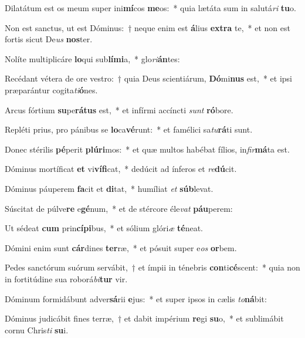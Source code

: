 \item Dilatátum est os meum super ini\textbf{mí}cos \textbf{me}os:~* quia lætáta sum in salutá\textit{ri} \textbf{tu}o.
\item Non est sanctus, ut est Dóminus:~† neque enim est \textbf{á}lius \textbf{ex}\textbf{tra} te,~* et non est fortis sicut De\textit{us} \textbf{nos}ter.
\item Nolíte multiplicáre \textbf{lo}qui sub\textbf{lí}\textbf{mi}a,~* glo\textit{ri}\textbf{án}tes:
\item Recédant vétera de ore vestro:~† quia Deus scientiárum, \textbf{Dó}mi\textbf{nus} est,~* et ipsi præparántur cogita\textit{ti}\textbf{ó}nes.
\item Arcus fórtium \textbf{su}pe\textbf{rá}\textbf{tus} est,~* et infírmi accíncti \textit{sunt} \textbf{ró}bore.
\item Repléti prius, pro pánibus se \textbf{lo}ca\textbf{vé}runt:~* et famélici sa\textit{tu}\textbf{rá}ti sunt.
\item Donec stérilis \textbf{pé}perit \textbf{plú}\textbf{ri}mos:~* et quæ multos habébat fílios, in\textit{fir}\textbf{má}ta est.
\item Dóminus mortíficat \textbf{et} vi\textbf{ví}\textbf{fi}cat,~* dedúcit ad ínferos et \textit{re}\textbf{dú}cit.
\item Dóminus páuperem \textbf{fa}cit et \textbf{di}tat,~* humíliat \textit{et} \textbf{súb}levat.
\item Súscitat de púlve\textbf{re} e\textbf{gé}num,~* et de stércore éle\textit{vat} \textbf{páu}perem:
\item Ut sédeat \textbf{cum} prin\textbf{cí}\textbf{pi}bus,~* et sólium glóri\textit{æ} \textbf{té}neat.
\item Dómini enim sunt \textbf{cár}dines \textbf{ter}ræ,~* et pósuit super e\textit{os} \textbf{or}bem.
\item Pedes sanctórum suórum servábit,~† et ímpii in ténebris \textbf{con}ti\textbf{cé}scent:~* quia non in fortitúdine sua roborá\textit{bi}\textbf{tur} vir.
\item Dóminum formidábunt adver\textbf{sá}rii \textbf{e}jus:~* et super ipsos in cælis \textit{to}\textbf{ná}bit:
\item Dóminus judicábit fines terræ,~† et dabit impérium \textbf{re}gi \textbf{su}o,~* et sublimábit cornu Chris\textit{ti} \textbf{su}i.
